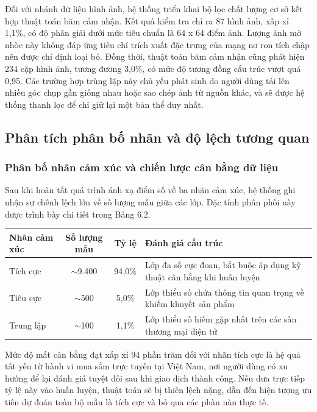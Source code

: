 Đối với nhánh dữ liệu hình ảnh, hệ thống triển khai bộ lọc chất lượng cơ sở kết hợp thuật toán băm cảm nhận. Kết quả kiểm tra chỉ ra 87 hình ảnh, xấp xỉ 1,1\%, có độ phân giải dưới mức tiêu chuẩn là 64 x 64 điểm ảnh. Lượng ảnh mờ nhòe này không đáp ứng tiêu chí trích xuất đặc trưng của mạng nơ ron tích chập nên được chỉ định loại bỏ. Đồng thời, thuật toán băm cảm nhận cũng phát hiện 234 cặp hình ảnh, tương đương 3,0\%, có mức độ tương đồng cấu trúc vượt quá 0,95. Các trường hợp trùng lặp này chủ yếu phát sinh do người dùng tải lên nhiều góc chụp gần giống nhau hoặc sao chép ảnh từ nguồn khác, và sẽ được hệ thống thanh lọc để chỉ giữ lại một bản thể duy nhất.

\subsection{Phân tích phân bố nhãn và độ lệch tương quan}

\subsubsection{Phân bố nhãn cảm xúc và chiến lược cân bằng dữ liệu}

Sau khi hoàn tất quá trình ánh xạ điểm số về ba nhãn cảm xúc, hệ thống ghi nhận sự chênh lệch lớn về số lượng mẫu giữa các lớp. Đặc tính phân phối này được trình bày chi tiết trong Bảng 6.2.

\begin{center}
\renewcommand{\arraystretch}{1.4}
\begin{tabularx}{\textwidth}{|l|c|c|X|}
\hline
\rowcolor[HTML]{E8E8E8}
\textbf{Nhãn cảm xúc} & \textbf{Số lượng mẫu} & \textbf{Tỷ lệ} & \textbf{Đánh giá cấu trúc} \\
\hline
Tích cực & $\sim$9.400 & 94,0\% & Lớp đa số cực đoan, bắt buộc áp dụng kỹ thuật cân bằng khi huấn luyện \\
\hline
Tiêu cực & $\sim$500 & 5,0\% & Lớp thiểu số chứa thông tin quan trọng về khiếm khuyết sản phẩm \\
\hline
Trung lập & $\sim$100 & 1,1\% & Lớp thiểu số hiếm gặp nhất trên các sàn thương mại điện tử \\
\hline
\end{tabularx}
\end{center}

Mức độ mất cân bằng đạt xấp xỉ 94 phần trăm đối với nhãn tích cực là hệ quả tất yếu từ hành vi mua sắm trực tuyến tại Việt Nam, nơi người dùng có xu hướng để lại đánh giá tuyệt đối sau khi giao dịch thành công. Nếu đưa trực tiếp tỷ lệ này vào huấn luyện, thuật toán sẽ bị thiên lệch nặng, dẫn đến hiện tượng ưu tiên dự đoán toàn bộ mẫu là tích cực và bỏ qua các phàn nàn thực tế. 

